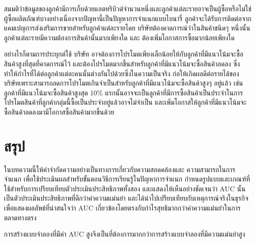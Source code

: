 \documentclass[twoside, twocolumn, 12pt]{article}
\let\OLDthebibliography\thebibliography
\renewcommand\thebibliography[1]{
  \OLDthebibliography{#1}
  \setlength{\parskip}{0pt}
  \setlength{\itemsep}{0pt plus 0.3ex}
}
\begin{document}
สมมติว่าข้อมูลของลูกค้ามีการเก็บด้วยแอตทริบิวต์จำนวนหนึ่งและลูกค้าแต่ละรายอาจเป็นผู้ซื้อหรือไม่ใช่ผู้ซื้อผลิตภัณฑ์บางอย่างเนื่องจากปัญหานี้เป็นปัญหาการจำแนกแบบไบนารี่ ลูกค้าจะได้รับการติดต่อจากแคมเปญการส่งเสริมการขายสำหรับลูกค้าแต่ละรายโดย บริษัทต้องคาดการณ์ว่าในสินค้าชนิดๆ หนึ่งนั้นลูกค้าแต่ละรายมีความต้องการสินค้านั้นมากเพียงใด และ ต้องเพิ่มโอกาสการซื้อมากน้อยเพียงใด

อย่างไรก็ตามการประยุกต์ใช้ บริษัท อาจต้องการโปรโมตเพียงเล็กน้อยให้กับลูกค้าที่มีแนวโน้มจะซื้อสินค้าสูงที่สุดที่คาดการณ์ไว้ และต้องโปรโมตมากขึ้นสำหรับลูกค้าที่มีแนวโน้มจะซื้อสินค้าลดลง ซึ่งทำให้กำไรที่ได้ต่อลูกค้าแต่ละคนนั้นต่างกันไปด้วยซึ่งในความเป็นจริง ก่อให้เกิดผลดีต่อรายได้ของบริษัทเพราะสามารถลดการโปรโมตเกินจำเป็นสำหรับลูกค้าที่มีแนวโน้มจะซื้อสินค้าสูงๆ อยู่แล้ว เช่น ลูกค้าที่มีแนวโน้มจะซื้อสินค้าสูงสุด 10\% แรกนั้นอาจจะเป็นลูกค้าที่มีการซื้อสินค้าเป็นประจำในการโปรโมตสินค้าที่ลูกค้ากลุ่มนี้ซื้อเป็นประจำอยู่แล้วอาจไม่จำเป็น และเพิ่มโอกาสให้ลูกค้าที่มีแนวโน้มจะซื้อสินค้าลดลงมามีโอกาสซื้อสินค้ามากขึ้นด้วย 
\section{สรุป}
\quad ในบทความนี้ให้คำจำกัดความอย่างเป็นทางการเกี่ยวกับความสอดคล้องและ ความสามารถในการจำแนก เพื่อใช้ประเมินผลสำหรับขั้นตอนวิธีการเรียนรู้ในปัญหาการจำแนก กำหนดรูปแบบและเกณฑ์ที่ใช้สำหรับการเปรียบเทียบตัวประเมินประสิทธิภาพทั้งสอง และแสดงให้เห็นอย่างชัดเจนว่า AUC นั้นเป็นตัวประเมินประสิทธิภาพที่ดีกว่าค่าความแม่นยำ และได้นำไปเปรียบเทียบกับเหตุการณ์จริงในธุรกิจเพื่อแสดงผลลัพธ์ที่น่าสนใจว่า AUC เกี่ยวข้องโดยตรงกับกำไรสุทธิมากกว่าค่าความแม่นยำในการตลาดทางตรง

การสร้างแบบจำลองที่มีค่า AUC สูงจึงเป็นที่ต้องการมากกว่าการสร้างแบบจำลองที่มีความแม่นยำสูง
\renewcommand\refname{ข้อมูลอ้างอิง}
\end{document}
